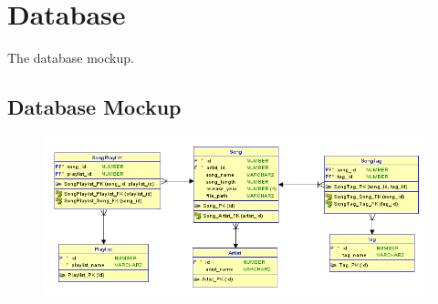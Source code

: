 \documentclass{article}
\begin{document}
\section{Database}
\quad The database mockup.

\subsection{Database Mockup}

\begin{figure}[h]
\includegraphics[width=18cm]{Images/AMP_DB_Mockup.PNG}
\end{figure}
\end{document}
